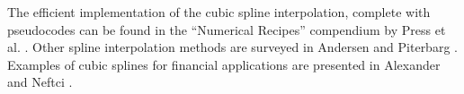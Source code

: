 The efficient implementation of the cubic spline interpolation, complete with
pseudocodes can be found in the ``Numerical Recipes'' compendium by Press et al.
\cite{32}. Other spline interpolation methods are surveyed in Andersen and Piterbarg
\cite{3}. Examples of cubic splines for financial applications are presented in
Alexander \cite{1} and Neftci \cite{30}.

